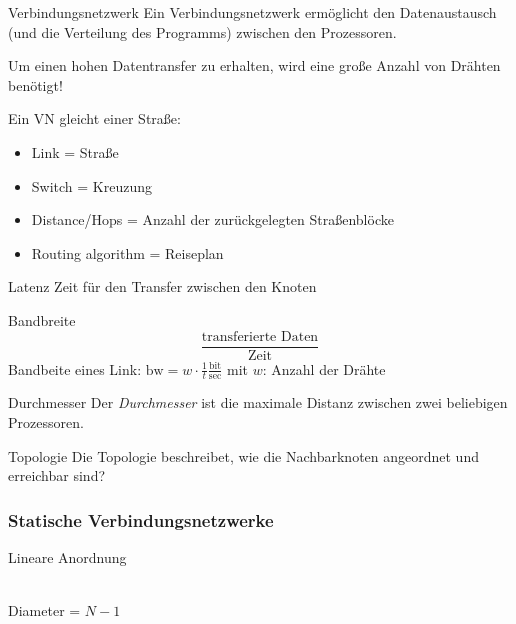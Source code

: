\begin{defi}{Verbindungsnetzwerk}
    Ein Verbindungsnetzwerk ermöglicht den Datenaustausch (und die Verteilung des Programms) zwischen den Prozessoren.
    
    Um einen hohen Datentransfer zu erhalten, 
    wird eine große Anzahl von Drähten benötigt!
    
    Ein VN gleicht einer Straße:
    \begin{itemize}
        \item Link = Straße
        \item Switch = Kreuzung
        \item Distance/Hops = Anzahl der zurückgelegten Straßenblöcke
        \item Routing algorithm = Reiseplan
    \end{itemize}
    
\end{defi}

\begin{defi}[Verbindungsnetzwerk]{Latenz}
    Zeit für den Transfer zwischen den Knoten
\end{defi}

\begin{defi}[Verbindungsnetzwerk]{Bandbreite}
    \[\frac{\text{transferierte Daten}}{\text{Zeit}}\]
    Bandbeite eines Link: $\text{bw} = w \cdot \frac{1}{t}\frac{\text{bit}}{\text{sec}}$
    mit $w$: Anzahl der Drähte
\end{defi}

\begin{defi}[Verbindungsnetzwerk]{Durchmesser}
    Der \emph{Durchmesser} ist die maximale Distanz zwischen zwei beliebigen Prozessoren.
\end{defi}

\begin{defi}[Verbindungsnetzwerk]{Topologie}
    Die Topologie beschreibet, 
    wie die Nachbarknoten angeordnet und erreichbar sind?
\end{defi}

\subsubsection{Statische Verbindungsnetzwerke}

\begin{defi}{Lineare Anordnung}
    \begin{center}
        \\
        Diameter = $N-1$
    \end{center}
\end{defi}

